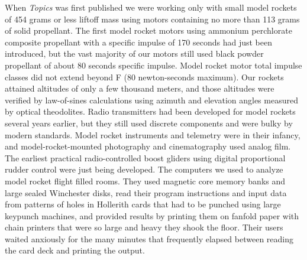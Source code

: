 When \emph{Topics} was first published we were working only with small model rockets of 454 grams or
less liftoff mass using motors containing no more than 113 grams of solid propellant. The first model
rocket motors using ammonium perchlorate composite propellant with a specific impulse of 170 seconds
had just been introduced, but the vast majority of our motors still used black powder propellant of
about 80 seconds specific impulse. Model rocket motor total impulse classes did not extend beyond F
(80 newton-seconds maximum). Our rockets attained altitudes of only a few thousand meters, and those
altitudes were verified by law-of-sines calculations using azimuth and elevation angles measured by
optical theodolites. Radio transmitters had been developed for model rockets several years earlier,
but they still used discrete components and were bulky by modern standards. Model rocket instruments
and telemetry were in their infancy, and model-rocket-mounted photography and cinematography used
analog film. The earliest practical radio-controlled boost gliders using digital proportional rudder
control were just being developed. The computers we used to analyze model rocket flight filled rooms.
They used magnetic core memory banks and large sealed Winchester disks, read their program
instructions and input data from patterns of holes in Hollerith cards that had to be punched using
large keypunch machines, and provided results by printing them on fanfold paper with chain printers
that were so large and heavy they shook the floor. Their users waited anxiously for the many minutes
that frequently elapsed between reading the card deck and printing the output.

